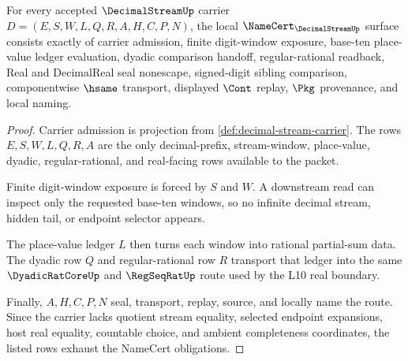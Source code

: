 \begin{theorem}
\label{thm:decimal-stream-namecert-obligations}
For every accepted $\DecimalStreamUp$ carrier $D=(E,S,W,L,Q,R,A,H,C,P,N)$, the local $\NameCert_{\DecimalStreamUp}$ surface consists exactly of carrier admission, finite digit-window exposure, base-ten place-value ledger evaluation, dyadic comparison handoff, regular-rational readback, Real and DecimalReal seal nonescape, signed-digit sibling comparison, componentwise $\hsame$ transport, displayed $\Cont$ replay, $\Pkg$ provenance, and local naming.
\end{theorem}
\begin{proof}
Carrier admission is projection from \autoref{def:decimal-stream-carrier}. The rows $E,S,W,L,Q,R,A$ are the only decimal-prefix, stream-window, place-value, dyadic, regular-rational, and real-facing rows available to the packet.

Finite digit-window exposure is forced by $S$ and $W$. A downstream read can inspect only the requested base-ten windows, so no infinite decimal stream, hidden tail, or endpoint selector appears.

The place-value ledger $L$ then turns each window into rational partial-sum data. The dyadic row $Q$ and regular-rational row $R$ transport that ledger into the same $\DyadicRatCoreUp$ and $\RegSeqRatUp$ route used by the L10 real boundary.

Finally, $A,H,C,P,N$ seal, transport, replay, source, and locally name the route. Since the carrier lacks quotient stream equality, selected endpoint expansions, host real equality, countable choice, and ambient completeness coordinates, the listed rows exhaust the NameCert obligations.
\end{proof}

